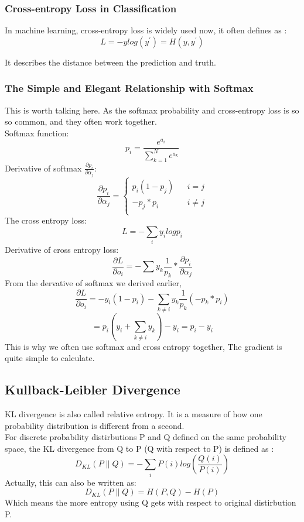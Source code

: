 \documentclass{article}
\begin{document}
\subsubsection{Cross-entropy Loss in Classification}
In machine learning, cross-entropy loss is widely used now, it often defines as : 
$$L=-ylog(y^{'})=H(y,y^{'})$$

It describes the distance between the prediction and truth.
\subsubsection{The Simple and Elegant Relationship with Softmax}
This is worth talking here. As the softmax probability and cross-entropy loss is so so common, and they often work together.\\
Softmax function:
$$p_{i}=\frac{e^{a_{i}}}{\sum_{k=1}^{N}e^{a_{k}}}$$
Derivative of softmax $\frac{\partial p_{i}}{\partial \alpha_{j}}$: \\
\begin{equation}
\nonumber
\frac{\partial p_{i}}{\partial \alpha_{j}}=\left\{
\begin{aligned}
p_{i}(1-p_{j}) & & i=j \\
-p_{j}*p_{i}  && i\neq j \\
\end{aligned}
\right.
\end{equation}
The cross entropy loss:
$$L=-\sum_{i}y_{i}logp_{i}$$
Derivative of cross entropy loss:
$$\frac{\partial L}{\partial o_{i}}=-\sum y_{k}\frac{1}{p_{k}}*\frac{\partial p_{i}}{\partial \alpha_{j}}$$
From the dervative of softmax we derived earlier,
$$\frac{\partial L}{\partial o_{i}}=-y_{i}(1-p_{i})-\sum_{k \neq i}y_{k}\frac{1}{p_{k}}(-p_{k}*p_{i})$$
$$=p_{i}(y_{i}+\sum _{k \neq i}y_{k})-y_{i}=p_{i}-y_{i}$$
This is why we often use softmax and cross entropy together, The gradient is quite simple to calculate. 
\subsection{Kullback-Leibler Divergence}
KL divergence is also called relative entropy. It is a measure of how one probability distribution is different from a second.\\
For discrete probability distirbutions P and Q defined on the same probability space, the KL divergence from Q to P (Q with respect to P) is defined as :
$$D_{KL}(P \parallel Q)=-\sum_{i}P(i)log(\frac{Q(i)}{P(i)})$$
Actually, this can also be written as: 
$$D_{KL}(P \parallel Q)=H(P,Q)-H(P)$$
Which means the more entropy using Q gets with respect to original distirbution P.
\end{document}
